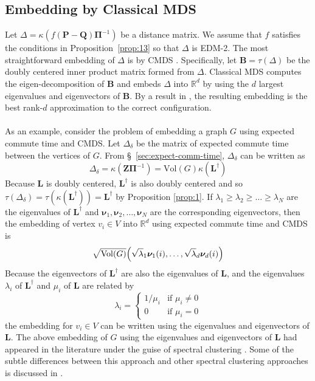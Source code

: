 \documentclass[10pt,twocolumn]{article}
\numberwithin{equation}{section}
\begin{document}
\subsection{Embedding by Classical MDS}
\label{sec:embedd-class-mds}
Let $\Delta = \kappa(f(\mathbf{P} - \mathbf{Q})\bm{\Pi}^{-1})$ be a
distance matrix. We assume that $f$ satisfies the conditions in
Proposition~\ref{prop:13} so that $\Delta$ is EDM-2. The most
straightforward embedding of $\Delta$ is by CMDS
\cite{gower66:_some,torgesen52:_multid}. Specifically, let $\mathbf{B}
= \tau(\Delta)$ be the doubly centered inner product matrix
formed from $\Delta$. Classical MDS computes the eigen-decomposition of
$\mathbf{B}$ and embeds $\Delta$ into $\mathbb{R}^{d}$ by using
the $d$ largest eigenvalues and eigenvectors of $\mathbf{B}$. By a
result in \cite{eckart36:_approx}, the resulting embedding is the
best rank-$d$ approximation to the correct configuration. \\ \\
\noindent
As an example, consider the problem of embedding a graph $G$ using
expected commute time and CMDS. Let $\Delta_\delta$ be the
matrix of expected commute time between the vertices of $G$. From
\S~\ref{sec:expect-comm-time}, $\Delta_{\delta}$ can be written as
\begin{equation*}
  \Delta_{\delta} = \kappa(\mathbf{Z}\bm{\Pi}^{-1}) = \mathrm{Vol}(G)
  \kappa(\mathbf{L}^{\dagger})
\end{equation*}
Because $\mathbf{L}$ is doubly centered, $\mathbf{L}^{\dagger}$ is
also doubly centered and so $\tau(\Delta_{\delta}) =
\tau(\kappa(\mathbf{L}^{\dagger})) = \mathbf{L}^{\dagger}$ by
Proposition \ref{prop:1}. If $\lambda_1 \geq \lambda_2 \geq \dots \geq
\lambda_N$ are the eigenvalues of $\mathbf{L}^{\dagger}$ and
$\bm{\nu}_1, \bm{\nu}_2, \dots, \bm{\nu}_N$ are the corresponding
eigenvectors, then the embedding of vertex $v_i \in V$ into
$\mathbb{R}^{d}$ using expected commute time and CMDS is
\begin{equation}
  \label{eq:9}
  \sqrt{\mathrm{Vol}(G)} 
\Bigl(\sqrt{\lambda}_1 \bm{\nu}_1(i), \dots, \sqrt{\lambda}_d \bm{\nu}_d(i) \Bigr)
\end{equation}
Because the eigenvectors of $\mathbf{L}^{\dagger}$ are also the
eigenvalues of $\mathbf{L}$, and the eigenvalues $\lambda_i$ of  
$\mathbf{L}^{\dagger}$ and $\mu_i$ of $\mathbf{L}$ are related by
\begin{equation}
  \label{eq:19}
  \lambda_i = \begin{cases}
    1/\mu_i & \text{if $\mu_i \not = 0$} \\
    0 & \text{if $\mu_i = 0$}
    \end{cases}
\end{equation}
the embedding for $v_i \in V$ can be written using the eigenvalues and
eigenvectors of $\mathbf{L}$. The above embedding of $G$ using the
eigenvalues and eigenvectors of
$\mathbf{L}$ had appeared in the literature under the guise of
spectral clustering \cite{yen07:_graph}. Some of the subtle differences between this approach and other 
spectral clustering approaches is discussed in \cite{luxburg07:_tutor_spect_clust}. 
\end{document}
